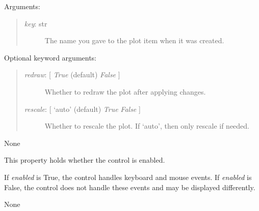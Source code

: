 \documentclass[letterpaper,10pt,english]{sphinxmanual}
\begin{document}
\begin{fulllineitems}
\begin{fulllineitems}
Arguments:
\begin{quote}
\begin{description}
\item[{\emph{key}: str}] \leavevmode
The name you gave to the plot item when it was created.

\end{description}
\end{quote}

Optional keyword arguments:
\begin{quote}
\begin{description}
\item[{\emph{redraw}: {[} \emph{True}  (default) \textbar{} \emph{False} {]}}] \leavevmode
Whether to redraw the plot after applying changes.

\item[{\emph{rescale}: {[} `auto' (default) \textbar{} \emph{True} \textbar{} \emph{False} {]}}] \leavevmode
Whether to rescale the plot. If `auto', then only rescale if needed.

\end{description}
\end{quote}

\end{fulllineitems}


\begin{fulllineitems}
\label{api:mpl.Plot2D.draw_action}
None

\end{fulllineitems}


\begin{fulllineitems}
\label{api:mpl.Plot2D.enabled}
This property holds whether the control is enabled.

If \emph{enabled} is True, the control handles keyboard and mouse events.
If \emph{enabled} is False, the control does not handle these events and may
be displayed differently.

\end{fulllineitems}


\begin{fulllineitems}
\label{api:mpl.Plot2D.events_length}
None


\end{fulllineitems}
\end{fulllineitems}
\end{document}
